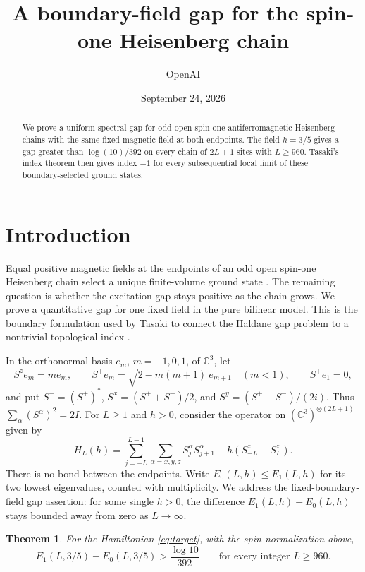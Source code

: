 \documentclass[11pt]{article}
\title{A boundary-field gap for the spin-one Heisenberg chain}
\author{OpenAI}
\date{September 24, 2026}
\newtheorem{theorem}{Theorem}[section]
\theoremstyle{remark}
\numberwithin{equation}{section}
\begin{document}
\begin{abstract}
We prove a uniform spectral gap for odd open spin-one antiferromagnetic
Heisenberg chains with the same fixed magnetic field at both endpoints.
The field $h=3/5$ gives a gap greater than $\log(10)/392$ on every chain
of $2L+1$ sites with $L\ge960$. Tasaki's index theorem then gives index $-1$
for every subsequential local limit of these boundary-selected ground states.
\end{abstract}

\section{Introduction}
Equal positive magnetic fields at the endpoints of an odd open spin-one
Heisenberg chain select a unique finite-volume ground state
\cite[Lemma 1]{Tasaki2025}. The remaining question is whether the
excitation gap stays positive as the chain grows. We prove a
quantitative gap for one fixed field in the pure bilinear model.
This is the boundary formulation used by Tasaki to connect the
Haldane gap problem to a nontrivial topological index \cite{Tasaki2025}.

In the orthonormal basis $e_m$, $m=-1,0,1$, of $\mathbb C^3$, let
\[
 S^ze_m=me_m,\qquad
 S^+e_m=\sqrt{2-m(m+1)}\,e_{m+1}\quad(m<1),\qquad S^+e_1=0,
\]
and put $S^-=(S^+)^*$, $S^x=(S^++S^-)/2$, and
$S^y=(S^+-S^-)/(2i)$. Thus $\sum_\alpha(S^\alpha)^2=2I$.
For $L\ge1$ and $h>0$, consider the operator on
$(\mathbb C^3)^{\otimes(2L+1)}$ given by
\begin{equation}\label{eq:target}
 H_L(h)=\sum_{j=-L}^{L-1}\sum_{\alpha=x,y,z}S_j^\alpha S_{j+1}^\alpha
       -h(S_{-L}^z+S_L^z).
\end{equation}
There is no bond between the endpoints. Write $E_0(L,h)\le E_1(L,h)$
for its two lowest eigenvalues, counted with multiplicity. We address
the fixed-boundary-field gap assertion: for some single $h>0$, the
difference $E_1(L,h)-E_0(L,h)$ stays bounded away from zero as
$L\to\infty$.

\begin{theorem}\label{thm:main}
For the Hamiltonian \eqref{eq:target}, with the spin normalization above,
\[
 E_1(L,3/5)-E_0(L,3/5)>\frac{\log 10}{392}
 \qquad\text{for every integer }L\ge960.
\]
\end{theorem}
\end{document}
